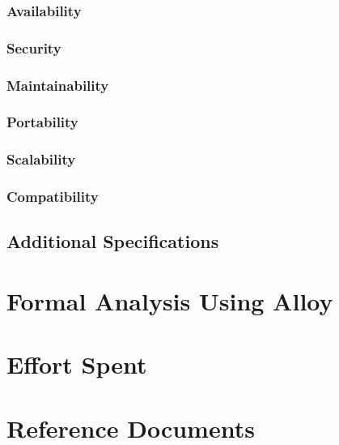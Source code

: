 \documentclass{article}
\begin{document}
\subsubsection{Availability}
\subsubsection{Security}
\subsubsection{Maintainability}
\subsubsection{Portability}
\subsubsection{Scalability}
\subsubsection{Compatibility}

\subsection{Additional Specifications}

\section{Formal Analysis Using Alloy}

\section{Effort Spent}

\section{Reference Documents}
\end{document}
